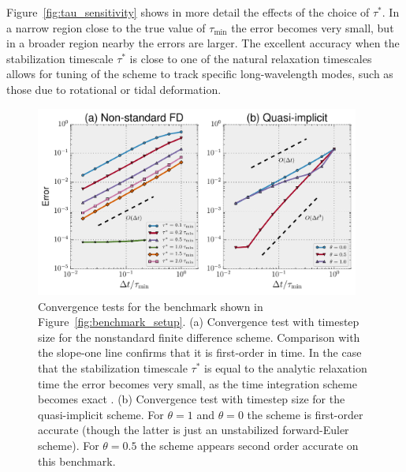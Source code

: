 \documentclass[preprint,12pt,authoryear]{elsarticle}
\begin{document}
Figure~\ref{fig:tau_sensitivity} shows in more detail the effects of the choice of $\tau^*$. In a narrow region 
close to the true value of $\tau_\mathrm{min}$ the error becomes very small, but in a broader region nearby 
the errors are larger. 
The excellent accuracy when the stabilization timescale $\tau^*$ is close to one of the natural relaxation
timescales allows for tuning of the scheme to track specific long-wavelength modes, such as 
those due to rotational or tidal deformation.

\begin{figure}
\includegraphics[width=0.95\textwidth]{figures/timestep_convergence.pdf}
\caption[Convergence tests for the topography relaxation benchmark.]{Convergence tests for the benchmark shown in Figure~\ref{fig:benchmark_setup}. (a) Convergence test with timestep size for the nonstandard finite difference scheme. Comparison with the slope-one line confirms that it is first-order in time. In the case that the stabilization timescale $\tau^*$ is equal to the analytic relaxation time the error becomes very small, as the time integration scheme becomes exact \citep{mickens2002nonstandard}. (b) Convergence test with timestep size for the quasi-implicit scheme. For $\theta = 1$ and $\theta = 0$ the scheme is first-order accurate (though the latter is just an unstabilized forward-Euler scheme). For $\theta=0.5$ the scheme appears second order accurate on this benchmark.}
\label{fig:timestep_convergence}
\end{figure}
\end{document}
